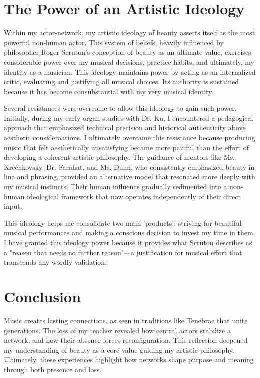\documentclass{article} %
\begin{document}
\section{The Power of an Artistic Ideology}

Within my actor-network, my artistic ideology of beauty asserts itself as the most powerful non-human actor.
This system of beliefs, heavily influenced by philosopher Roger Scruton's conception of beauty as an ultimate value, exercises considerable power over my musical decisions, practice habits, and ultimately, my identity as a musician.
This ideology maintains power by acting as an internalized critic, evaluating and justifying all musical choices. 
Its authority is sustained because it has become consubstantial with my very musical identity.

Several resistances were overcome to allow this ideology to gain such power. 
Initially, during my early organ studies with Dr. Ku, I encountered a pedagogical approach that emphasized technical precision and historical authenticity above aesthetic consideraations.
I ultimately overcame this resistance because producing music that felt aesthetically unsatisfying became more painful than the effort of developing a coherent artistic philosophy. 
The guidance of mentors like Ms. Krechkovsky. Dr. Farahat, and Ms. Dunn, who consistently emphasized beauty in line and phrasing, provided an alternative model that resonated more deeply with my musical instincts. 
Their human influence gradually sedimented into a non-human ideological framework that now operates independently of their direct input.

This ideology helps me consolidate two main 'products': striving for beautiful musical performances and making a conscious decision to invest my time in them.
I have granted this ideology power because it provides what Scruton describes as a "reason that needs no further reason"—a justification for musical effort that transcends any wordly validation.

\section{Conclusion}

Music creates lasting connections, as seen in traditions like Tenebrae that unite generations. 
The loss of my teacher revealed how central actors stabilize a network, and how their absence forces reconfiguration. 
This reflection deepened my understanding of beauty as a core value guiding my artistic philosophy. 
Ultimately, these experiences highlight how networks shape purpose and meaning through both presence and loss.


%
%


\label{last_page}
\end{document}
